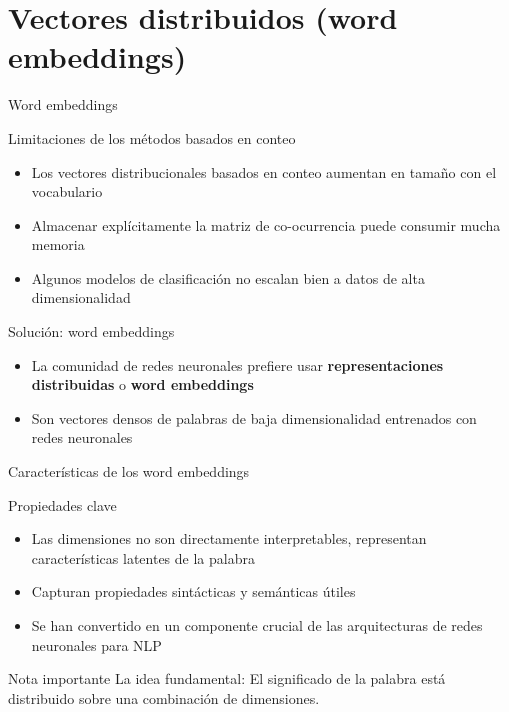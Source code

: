 \documentclass[handout]{beamer}
\begin{document}
\section{Vectores distribuidos (word embeddings)}

\begin{frame}{Word embeddings}
  \begin{block}{Limitaciones de los métodos basados en conteo}
    \begin{itemize}
      \item Los vectores distribucionales basados en conteo aumentan en tamaño con el vocabulario
      \item Almacenar explícitamente la matriz de co-ocurrencia puede consumir mucha memoria
      \item Algunos modelos de clasificación no escalan bien a datos de alta dimensionalidad
    \end{itemize}
  \end{block}
  
  \begin{alertblock}{Solución: word embeddings}
    \begin{itemize}
      \item La comunidad de redes neuronales prefiere usar \textbf{representaciones distribuidas} o \textbf{word embeddings}
      \item Son vectores densos de palabras de baja dimensionalidad entrenados con redes neuronales
    \end{itemize}
  \end{alertblock}
\end{frame}

\begin{frame}{Características de los word embeddings}
  \begin{block}{Propiedades clave}
    \begin{itemize}
      \item Las dimensiones no son directamente interpretables, representan características latentes de la palabra
      \item Capturan propiedades sintácticas y semánticas útiles
      \item Se han convertido en un componente crucial de las arquitecturas de redes neuronales para NLP
    \end{itemize}
  \end{block}
  
  \begin{alertblock}{Nota importante}
    La idea fundamental: El significado de la palabra está distribuido sobre una combinación de dimensiones.
  \end{alertblock}
\end{frame}
\end{document}
